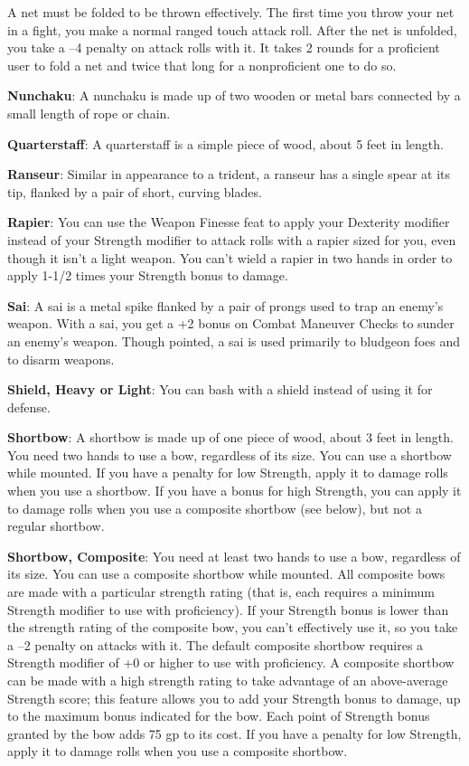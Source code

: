A net must be folded to be thrown effectively. The first time you throw your net in a fight, you make a normal ranged touch attack roll. After the net is unfolded, you take a --4 penalty on attack rolls with it. It takes 2 rounds for a proficient user to fold a net and twice that long for a nonproficient one to do so.
		
\textbf{Nunchaku}: A nunchaku is made up of two wooden or metal bars connected by a small length of rope or chain.
		
\textbf{Quarterstaff}: A quarterstaff is a simple piece of wood, about 5 feet in length.
		
\textbf{Ranseur}: Similar in appearance to a trident, a ranseur has a single spear at its tip, flanked by a pair of short, curving blades.
		
\textbf{Rapier}: You can use the Weapon Finesse feat to apply your Dexterity modifier instead of your Strength modifier to attack rolls with a rapier sized for you, even though it isn't a light weapon. You can't wield a rapier in two hands in order to apply 1-1/2 times your Strength bonus to damage.
		
\textbf{Sai}: A sai is a metal spike flanked by a pair of prongs used to trap an enemy's weapon. With a sai, you get a +2 bonus on Combat Maneuver Checks to sunder an enemy's weapon. Though pointed, a sai is used primarily to bludgeon foes and to disarm weapons.
		
\textbf{Shield, Heavy or Light}: You can bash with a shield instead of using it for defense.
		
\textbf{Shortbow}: A shortbow is made up of one piece of wood, about 3 feet in length. You need two hands to use a bow, regardless of its size. You can use a shortbow while mounted. If you have a penalty for low Strength, apply it to damage rolls when you use a shortbow. If you have a bonus for high Strength, you can apply it to damage rolls when you use a composite shortbow (see below), but not a regular shortbow.
		
\textbf{Shortbow, Composite}: You need at least two hands to use a bow, regardless of its size. You can use a composite shortbow while mounted. All composite bows are made with a particular strength rating (that is, each requires a minimum Strength modifier to use with proficiency). If your Strength bonus is lower than the strength rating of the composite bow, you can't effectively use it, so you take a --2 penalty on attacks with it. The default composite shortbow requires a Strength modifier of +0 or higher to use with proficiency. A composite shortbow can be made with a high strength rating to take advantage of an above-average Strength score; this feature allows you to add your Strength bonus to damage, up to the maximum bonus indicated for the bow. Each point of Strength bonus granted by the bow adds 75 gp to its cost. If you have a penalty for low Strength, apply it to damage rolls when you use a composite shortbow. 
		
